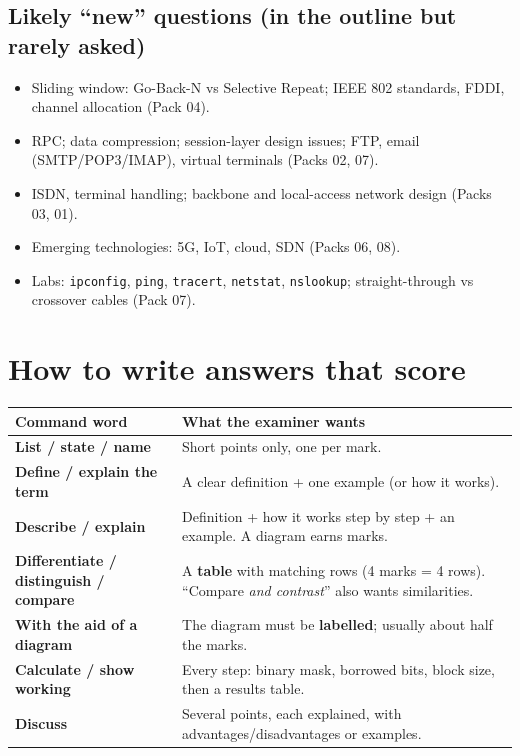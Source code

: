 \documentclass[10pt]{article}
\begin{document}
\subsection*{Likely ``new'' questions (in the outline but rarely asked)}
\begin{itemize}
\item Sliding window: Go-Back-N vs Selective Repeat; IEEE 802 standards, FDDI, channel allocation (Pack 04).
\item RPC; data compression; session-layer design issues; FTP, email (SMTP/POP3/IMAP), virtual terminals (Packs 02, 07).
\item ISDN, terminal handling; backbone and local-access network design (Packs 03, 01).
\item Emerging technologies: 5G, IoT, cloud, SDN (Packs 06, 08).
\item Labs: \texttt{ipconfig}, \texttt{ping}, \texttt{tracert}, \texttt{netstat}, \texttt{nslookup}; straight-through vs crossover cables (Pack 07).
\end{itemize}

\section{How to write answers that score}

\begin{center}\small
\begin{tabularx}{\linewidth}{@{}>{\bfseries}p{3.4cm}X@{}}
\toprule
Command word & What the examiner wants\\\midrule
List / state / name & Short points only, one per mark.\\
Define / explain the term & A clear definition + one example (or how it works).\\
Describe / explain & Definition + how it works step by step + an example. A diagram earns marks.\\
Differentiate / distinguish / compare & A \textbf{table} with matching rows (4 marks = 4 rows). ``Compare \emph{and contrast}'' also wants similarities.\\
With the aid of a diagram & The diagram must be \textbf{labelled}; usually about half the marks.\\
Calculate / show working & Every step: binary mask, borrowed bits, block size, then a results table.\\
Discuss & Several points, each explained, with advantages/disadvantages or examples.\\
\bottomrule
\end{tabularx}
\end{center}
\end{document}
